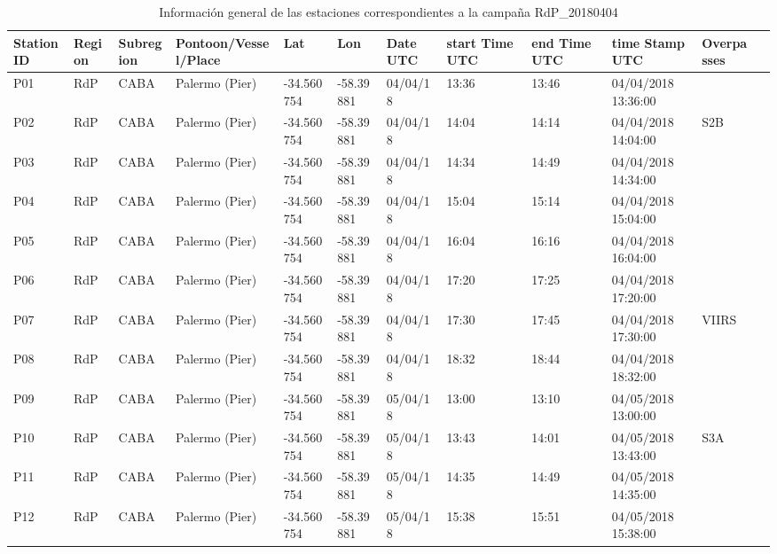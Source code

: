         \begin{table}
        \tiny
        \caption{Información general de las estaciones correspondientes a la campaña RdP\_20180404}
        \begin{adjustbox}{angle=90}
        \begin{tabularx}{1.4\textwidth}{|l|l|l|X|X|X|X|X|X|X|X|X|}
        \hline
        \rowcolor[HTML]{FFFC9E} 
        \textbf{Station ID} & \textbf{Region} & \textbf{Subregion} & \textbf{Pontoon/Vessel/Place} & \textbf{Lat} & \textbf{Lon} & \textbf{Date UTC} & \textbf{start Time UTC} & \textbf{end Time UTC} & \textbf{time Stamp UTC} & \textbf{Overpasses} \\ \hline
        P01 & RdP & CABA & Palermo (Pier) & -34.560754 & -58.39881 & 04/04/18 & 13:36 & 13:46 & 04/04/2018 13:36:00 &  \\ \hline
        P02 & RdP & CABA & Palermo (Pier) & -34.560754 & -58.39881 & 04/04/18 & 14:04 & 14:14 & 04/04/2018 14:04:00 & S2B \\ \hline
        P03 & RdP & CABA & Palermo (Pier) & -34.560754 & -58.39881 & 04/04/18 & 14:34 & 14:49 & 04/04/2018 14:34:00 &  \\ \hline
        P04 & RdP & CABA & Palermo (Pier) & -34.560754 & -58.39881 & 04/04/18 & 15:04 & 15:14 & 04/04/2018 15:04:00 &  \\ \hline
        P05 & RdP & CABA & Palermo (Pier) & -34.560754 & -58.39881 & 04/04/18 & 16:04 & 16:16 & 04/04/2018 16:04:00 &  \\ \hline
        P06 & RdP & CABA & Palermo (Pier) & -34.560754 & -58.39881 & 04/04/18 & 17:20 & 17:25 & 04/04/2018 17:20:00 &  \\ \hline
        P07 & RdP & CABA & Palermo (Pier) & -34.560754 & -58.39881 & 04/04/18 & 17:30 & 17:45 & 04/04/2018 17:30:00 & VIIRS \\ \hline
        P08 & RdP & CABA & Palermo (Pier) & -34.560754 & -58.39881 & 04/04/18 & 18:32 & 18:44 & 04/04/2018 18:32:00 &  \\ \hline
        P09 & RdP & CABA & Palermo (Pier) & -34.560754 & -58.39881 & 05/04/18 & 13:00 & 13:10 & 04/05/2018 13:00:00 &  \\ \hline
        P10 & RdP & CABA & Palermo (Pier) & -34.560754 & -58.39881 & 05/04/18 & 13:43 & 14:01 & 04/05/2018 13:43:00 & S3A \\ \hline
        P11 & RdP & CABA & Palermo (Pier) & -34.560754 & -58.39881 & 05/04/18 & 14:35 & 14:49 & 04/05/2018 14:35:00 &  \\ \hline
        P12 & RdP & CABA & Palermo (Pier) & -34.560754 & -58.39881 & 05/04/18 & 15:38 & 15:51 & 04/05/2018 15:38:00 &  \\ \hline

\end{tabularx}
\end{adjustbox}
\end{table}
